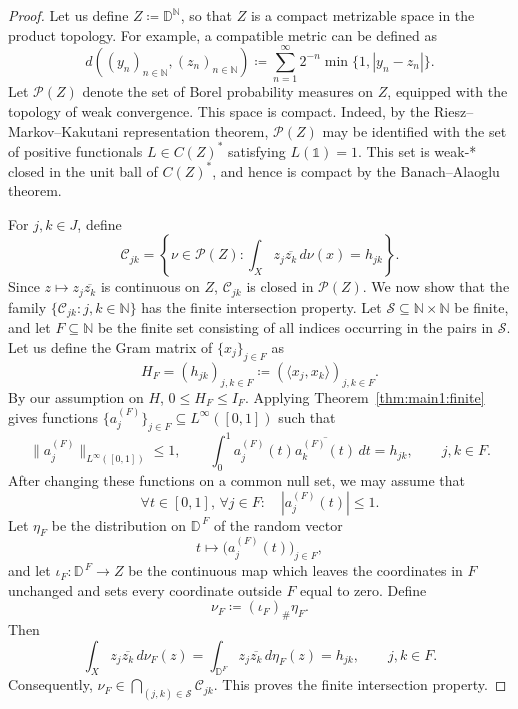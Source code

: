 \documentclass[10pt,a4paper]{amsart}
\def\D{{\mathbb D}}
\def\N{{\mathbb N}}
\begin{document}
\begin{proof}
Let us define $Z\coloneqq\D^{\N}$, so that $Z$ is a compact metrizable space in the product topology. For example, a compatible metric can be defined as
\begin{equation*}
d((y_n)_{n\in\N},(z_n)_{n\in\N})
\coloneqq
\sum_{n=1}^\infty
2^{-n}\min\{1,|y_{n}-z_{n}|\}.
\end{equation*}
Let $\mathcal P(Z)$ denote the set of Borel probability measures
on $Z$, equipped with the topology of weak convergence. This space
is compact. Indeed, by the Riesz--Markov--Kakutani representation theorem, $\mathcal P(Z)$ may be identified with the set of positive
functionals $L\in C(Z)^*$ satisfying $L(\mathds{1})=1$. This set is weak-*
closed in the unit ball of $C(Z)^*$, and hence is compact by the
Banach--Alaoglu theorem.

For $j,k\in J$, define
\begin{equation*}
\mathcal C_{jk}
=
\left\{
\nu\in\mathcal P(Z):
\int_X z_j\overline{z_k}\,d\nu(x)=h_{jk}
\right\}.
\end{equation*}
Since $z\longmapsto z_j\overline{z_k}$ is continuous on $Z$, $\mathcal C_{jk}$ is closed in
$\mathcal P(Z)$. We now show that the family $\{\mathcal C_{jk}:j,k\in \N\}$ has the finite intersection property. Let $\mathcal S\subseteq \N\times \N$ be finite, and let $F\subseteq \N$ be the finite set consisting of all indices occurring in the pairs in $\mathcal S$. Let us define the Gram matrix of $\{ x_j \}_{j \in F}$ as 
\begin{equation*}
    H_F= (h_{jk})_{j,k\in F}\coloneqq (\langle x_j, x_k\rangle)_{j,k\in F}.
\end{equation*}
By our assumption on $H$, $0\le H_F\le I_F$. Applying Theorem~\ref{thm:main1:finite} gives functions $\{a_j^{(F)}\}_{j\in F}\subseteq L^\infty([0,1])$ such that
\begin{equation*}
\|a_j^{(F)}\|_{L^\infty([0,1])}\le1,
\qquad
\int_0^1
a_j^{(F)}(t)\overline{a_k^{(F)}(t)}\,dt
=
h_{jk},
\qquad j,k\in F.
\end{equation*}
After changing these functions on a common null set, we may assume
that
\begin{equation*}
\forall t\in [0,1],\, \forall j\in F:\quad\left|a_j^{(F)}(t)\right|\le1.
\end{equation*}
Let $\eta_F$ be the distribution on
$\D^{\,F}$ of the random vector
\begin{equation*}
    t\longmapsto
    \bigl(a_j^{(F)}(t)\bigr)_{j\in F},
\end{equation*}
and let $\iota_F:\D^{\,F}\to Z$ be the continuous map which leaves the coordinates in $F$
unchanged and sets every coordinate outside $F$ equal to zero. Define
\begin{equation*}
\nu_F\coloneqq(\iota_F)_\#\eta_F.
\end{equation*}
Then
\begin{equation*}
    \int_X z_j\overline{z_k}\,d\nu_F(z)
    =
    \int_{\D^F} z_j\overline{z_k}\, d\eta_F(z)
    = h_{jk},
    \qquad j,k\in F.
\end{equation*}
Consequently, $\nu_F\in
\bigcap_{(j,k)\in\mathcal S}\mathcal C_{jk}$. This proves the finite intersection property.


\end{proof}
\end{document}
